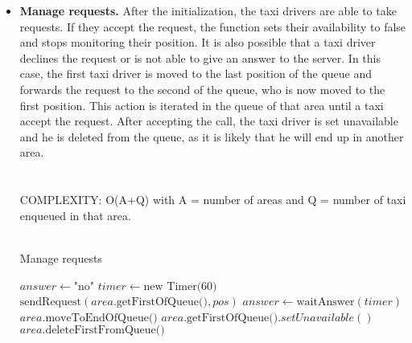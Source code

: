 \begin{itemize}
			
			\newpage
			\item \textbf{Manage requests.} After the initialization, the taxi drivers are able to take requests. If they accept the request, the function sets their availability to false and stops monitoring their position. It is also possible that a taxi driver declines the request or is not able to give an answer to the server. In this case, the first taxi driver is moved to the last position of the queue and forwards the request to the second of the queue, who is now moved to the first position. This action is iterated in the queue of that area until a taxi accept the request. After accepting the call, the taxi driver is set unavailable and he is deleted from the queue, as it is likely that he will end up in another area.\\
			 \\\\
			COMPLEXITY: O(A+Q) with A = number of areas and Q = number of taxi enqueued in that area.\\\\
				\begin{algorithm}
					\caption{Manage requests}
					\begin{algorithmic}[1]
						\State $answer \gets \text{"no"}$
						\State $timer \gets \text{new Timer(60)}$
							\State $\text{sendRequest}(area.\text{getFirstOfQueue()}, pos)$
							\State $answer \gets \text{waitAnswer}(timer)$
								\State $area.\text{moveToEndOfQueue()}$
							\EndIf
						\EndWhile
						\State $area.\text{getFirstOfQueue()}.setUnavailable()$
						\State $area.\text{deleteFirstFromQueue()}$
						\EndProcedure
					\end{algorithmic}
				\end{algorithm}
			

\end{itemize}
